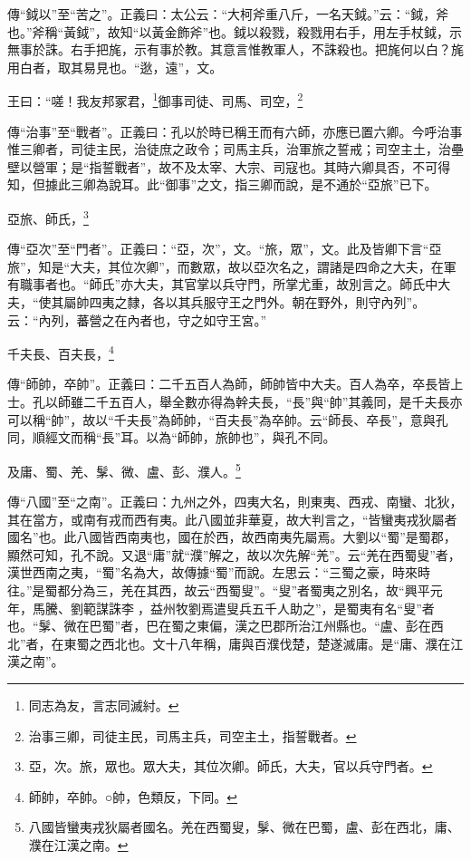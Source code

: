 {\noindent\zhuan{}\fzbyks 傳“鉞以”至“苦之”。正義曰：太公云：“大柯斧重八斤，一名天鉞。”云：“鉞，斧也。”斧稱“黃鉞”，故知“以黃金飾斧”也。鉞以殺戮，殺戮用右手，用左手杖鉞，示無事於誅。右手把旄，示有事於教。其意言惟教軍人，不誅殺也。把旄何以白？旄用白者，取其易見也。“逖，遠”，文。 \par}

王曰：“嗟！我友邦冢君，\footnote{同志為友，言志同滅紂。}御事司徒、司馬、司空，\footnote{治事三卿，司徒主民，司馬主兵，司空主土，指誓戰者。}

{\noindent\zhuan{}\fzbyks 傳“治事”至“戰者”。正義曰：孔以於時已稱王而有六師，亦應已置六卿。今呼治事惟三卿者，司徒主民，治徒庶之政令；司馬主兵，治軍旅之誓戒；司空主土，治壘壁以營軍；是“指誓戰者”，故不及太宰、大宗、司寇也。其時六卿具否，不可得知，但據此三卿為說耳。此“御事”之文，指三卿而說，是不通於“亞旅”已下。 \par}

亞旅、師氏，\footnote{亞，次。旅，眾也。眾大夫，其位次卿。師氏，大夫，官以兵守門者。}

{\noindent\zhuan{}\fzbyks 傳“亞次”至“門者”。正義曰：“亞，次”，文。“旅，眾”，文。此及皆卿下言“亞旅”，知是“大夫，其位次卿”，而數眾，故以亞次名之，謂諸是四命之大夫，在軍有職事者也。“師氏”亦大夫，其官掌以兵守門，所掌尤重，故別言之。師氏中大夫，“使其屬帥四夷之隸，各以其兵服守王之門外。朝在野外，則守內列”。云：“內列，蕃營之在內者也，守之如守王宮。” \par}

千夫長、百夫長，\footnote{師帥，卒帥。○帥，色類反，下同。}

{\noindent\zhuan{}\fzbyks 傳“師帥，卒帥”。正義曰：二千五百人為師，師帥皆中大夫。百人為卒，卒長皆上士。孔以師雖二千五百人，舉全數亦得為幹夫長，“長”與“帥”其義同，是千夫長亦可以稱“帥”，故以“千夫長”為師帥，“百夫長”為卒帥。云“師長、卒長”，意與孔同，順經文而稱“長”耳。以為“師帥，旅帥也”，與孔不同。 \par}

及庸、蜀、羌、髳、微、盧、彭、濮人。\footnote{八國皆蠻夷戎狄屬者國名。羌在西蜀叟，髳、微在巴蜀，盧、彭在西北，庸、濮在江漢之南。}

{\noindent\zhuan{}\fzbyks 傳“八國”至“之南”。正義曰：九州之外，四夷大名，則東夷、西戎、南蠻、北狄，其在當方，或南有戎而西有夷。此八國並非華夏，故大判言之，“皆蠻夷戎狄屬者國名”也。此八國皆西南夷也，國在於西，故西南夷先屬焉。大劉以“蜀”是蜀郡，顯然可知，孔不說。又退“庸”就“濮”解之，故以次先解“羌”。云“羌在西蜀叟”者，漢世西南之夷，“蜀”名為大，故傳據“蜀”而說。左思云：“三蜀之豪，時來時往。”是蜀都分為三，羌在其西，故云“西蜀叟”。“叟”者蜀夷之別名，故“興平元年，馬騰、劉範謀誅李𠐶，益州牧劉焉遣叟兵五千人助之”，是蜀夷有名“叟”者也。“髳、微在巴蜀”者，巴在蜀之東偏，漢之巴郡所治江州縣也。“盧、彭在西北”者，在東蜀之西北也。文十八年稱，庸與百濮伐楚，楚遂滅庸。是“庸、濮在江漢之南”。 \par}

